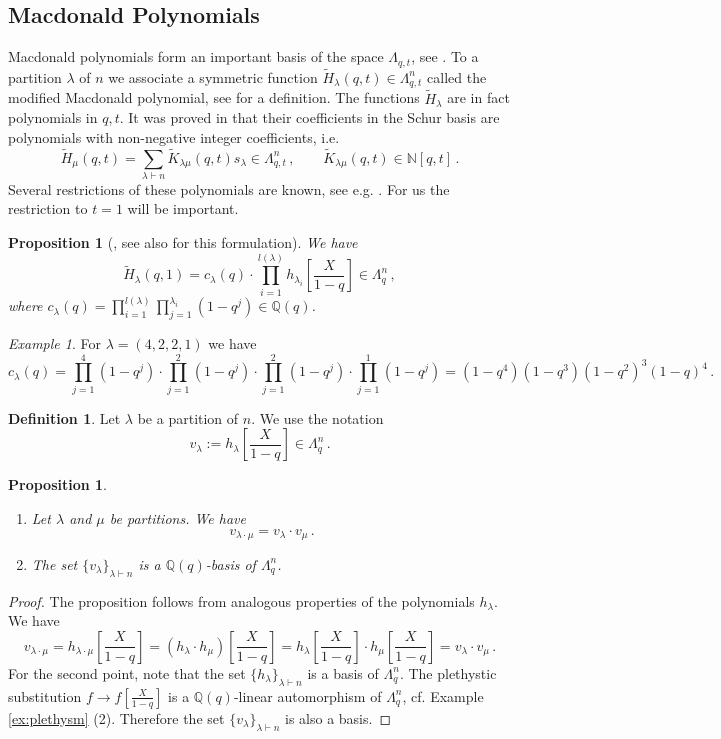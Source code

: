 \documentclass[12pt,a4paper]{amsart}
\theoremstyle{plain}
\newtheorem{pro}[tw]{Proposition}
\theoremstyle{definition}
\newtheorem{df}[tw]{Definition}
\theoremstyle{remark}
\newtheorem{ex}[tw]{Example}
\newcommand{\NN}{\mathbb{N}}
\newcommand{\QQ}{\mathbb{Q}}
\begin{document}
\subsection{Macdonald Polynomials}
Macdonald polynomials form an important basis of the space $\Lambda_{q,t}$, see \cite[Chapter 6]{Macdonald}. To a partition $\lambda$ of $n$ we associate a symmetric function  $\tilde{H}_\lambda(q,t) \in \Lambda_{q,t}^{n}$ called the modified Macdonald polynomial, see
{\cite[Proposition 2.1.1]{Haiman}}
for a definition. The functions $\tilde{H}_\lambda$ are in fact polynomials in $q,t$. It was proved in \cite[Theorem 2]{Haiman} that their coefficients in the Schur basis are polynomials with non-negative integer coefficients, i.e. 
$$\tilde{H}_\mu(q,t)= \sum_{\lambda \vdash n}\tilde{K}_{\lambda\mu}(q,t)s_\lambda \in \Lambda_{q,t}^{n}\,, \qquad  \tilde{K}_{\lambda\mu}(q,t) \in \NN[q,t] \,.$$
Several restrictions of these polynomials are known, see e.g. \cite[Section 3.5.3]{Haiman_surv}. For us the restriction to $t=1$ will be important.
\begin{pro}[{\cite[p. 364, Example 7]{Macdonald}, see also
		\cite[Proposition 3.5.8]{Haiman_surv} for this formulation}]
	\label{pro:t=1}
	We have
	$$\tilde{H}_\lambda(q,1)=c_\lambda(q) \cdot \prod_{i=1}^{l(\lambda)} h_{\lambda_i}\left[\frac{X}{1-q}\right] \in \Lambda_q^{n}\,,$$
	where $c_\lambda(q)=\prod_{i=1}^{l(\lambda)}\prod_{j=1}^{\lambda_i} (1-q^j)\in \QQ(q)$.
\end{pro}
\begin{ex}
	For $\lambda=(4,2,2,1)$ we have
	$$
	c_\lambda(q)=
	\prod_{j=1}^{4} (1-q^j)\cdot \prod_{j=1}^{2} (1-q^j) \cdot \prod_{j=1}^{2} (1-q^j)\cdot \prod_{j=1}^{1} (1-q^j)=
	(1-q^4)(1-q^3)(1-q^2)^3(1-q)^4\,.
	$$
\end{ex}
\begin{df}\label{df:v}
	Let $\lambda$ be a partition of $n$. We use the  notation
	$$v_\lambda:= h_{\lambda}\left[\frac{X}{1-q}\right] \in \Lambda_q^{n}\,.$$
\end{df}
\begin{pro}
	\label{pro:v}
	\begin{enumerate}
		\item Let $\lambda$ and $\mu$ be partitions. We have
		$$v_{\lambda\cdot\mu}=v_{\lambda}\cdot v_{\mu}\,.$$
		\item The set $\{v_{\lambda}\}_{\lambda \vdash n}$ is a $\QQ(q)$-basis of $\Lambda^n_q$.
	\end{enumerate}
\end{pro}
\begin{proof}
	The proposition follows from analogous properties of the polynomials $h_\lambda$. We have
	$$
	v_{\lambda\cdot\mu}=
	h_{\lambda\cdot\mu}\left[\frac{X}{1-q}\right]=
	(h_{\lambda}\cdot h_{\mu})\left[\frac{X}{1-q}\right]=
	h_{\lambda}\left[\frac{X}{1-q}\right]\cdot h_{\mu}\left[\frac{X}{1-q}\right]=
	v_\lambda\cdot v_\mu\,.
	$$
	For the second point, note that the set $\{h_{\lambda}\}_{\lambda \vdash n}$ is a basis of $\Lambda^n_q$. The plethystic substitution $f\to f[\frac{X}{1-q}]$ is a $\QQ(q)$-linear automorphism of $\Lambda^n_q$, cf. Example \ref{ex:plethysm} (2).
	Therefore the set $\{v_{\lambda}\}_{\lambda \vdash n}$ is also a basis.
\end{proof}
\end{document}
